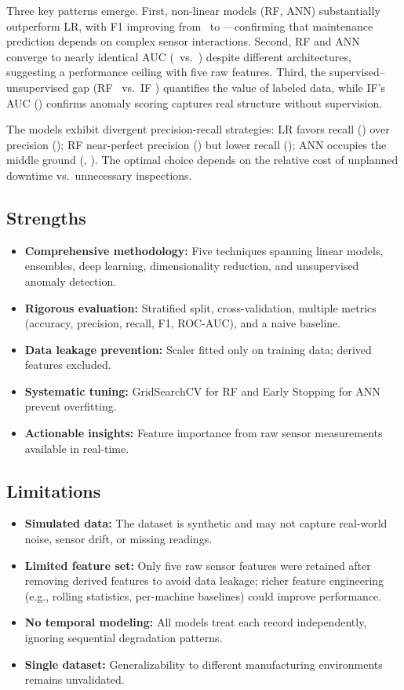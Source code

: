 \documentclass[11pt]{article}
\begin{document}
Three key patterns emerge. First, non-linear models (RF, ANN) substantially outperform LR, with F1 improving from \lrFone\ to \rfFone---confirming that maintenance prediction depends on complex sensor interactions. Second, RF and ANN converge to nearly identical AUC (\rfAuc\ vs.\ \annAuc) despite different architectures, suggesting a performance ceiling with five raw features. Third, the supervised--unsupervised gap (RF \rfFone\ vs.\ IF \isoFone) quantifies the value of labeled data, while IF's AUC (\isoAuc) confirms anomaly scoring captures real structure without supervision.

The models exhibit divergent precision-recall strategies: LR favors recall (\lrRec) over precision (\lrPrec); RF near-perfect precision (\rfPrec) but lower recall (\rfRec); ANN occupies the middle ground (\annPrec, \annRec). The optimal choice depends on the relative cost of unplanned downtime vs.\ unnecessary inspections.

\subsection{Strengths}

\begin{itemize}[noitemsep]
    \item \textbf{Comprehensive methodology:} Five techniques spanning linear models, ensembles, deep learning, dimensionality reduction, and unsupervised anomaly detection.
    \item \textbf{Rigorous evaluation:} Stratified split, cross-validation, multiple metrics (accuracy, precision, recall, F1, ROC-AUC), and a naive baseline.
    \item \textbf{Data leakage prevention:} Scaler fitted only on training data; derived features excluded.
    \item \textbf{Systematic tuning:} GridSearchCV for RF and Early Stopping for ANN prevent overfitting.
    \item \textbf{Actionable insights:} Feature importance from raw sensor measurements available in real-time.
\end{itemize}

\subsection{Limitations}

\begin{itemize}[noitemsep]
    \item \textbf{Simulated data:} The dataset is synthetic and may not capture real-world noise, sensor drift, or missing readings.
    \item \textbf{Limited feature set:} Only five raw sensor features were retained after removing derived features to avoid data leakage; richer feature engineering (e.g., rolling statistics, per-machine baselines) could improve performance.
    \item \textbf{No temporal modeling:} All models treat each record independently, ignoring sequential degradation patterns.
    \item \textbf{Single dataset:} Generalizability to different manufacturing environments remains unvalidated.
\end{itemize}
\end{document}
